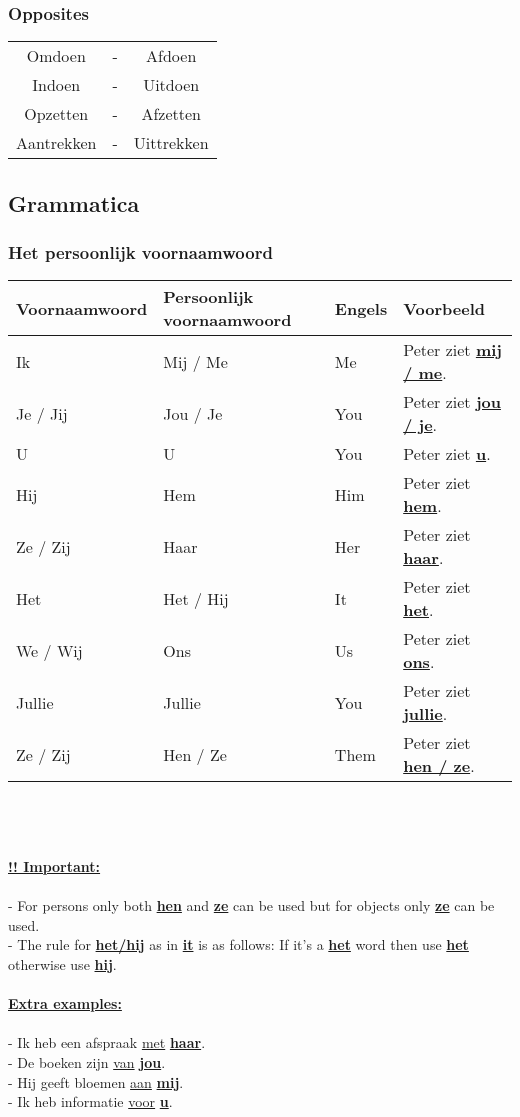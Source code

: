\documentclass[a4paper,14pt]{extarticle}
\newcommand{\attention}[1]{\underline{\textbf{!! #1}}}
\newcommand{\emp}[1]{\underline{\textbf{#1}}}
\begin{document}
\subsubsection{Opposites}
\begin{center}
\begin{tabularx}{180pt}{ c c c }
 \hline
 Omdoen & - & Afdoen \\
 Indoen & - & Uitdoen \\
 Opzetten & - & Afzetten \\
 Aantrekken & - & Uittrekken \\
\end{tabularx}
\end{center}
\newpage
\subsection{Grammatica}
\subsubsection{Het persoonlijk voornaamwoord}
\begin{tabularx}{\textwidth}{ p{} p{} p{} p{} }
 \hline
 Voornaamwoord & Persoonlijk voornaamwoord & Engels &  Voorbeeld \\
 \hline
 Ik & Mij / Me & Me & Peter ziet \emp{mij / me}. \\
 Je / Jij & Jou / Je & You & Peter ziet \emp{jou / je}. \\
 U & U & You & Peter ziet \emp{u}. \\
 Hij & Hem & Him & Peter ziet \emp{hem}. \\
 Ze / Zij & Haar & Her & Peter ziet \emp{haar}. \\
 Het & Het / Hij & It & Peter ziet \emp{het}. \\
 We / Wij & Ons & Us & Peter ziet \emp{ons}. \\
 Jullie & Jullie & You & Peter ziet \emp{jullie}. \\
 Ze / Zij & Hen / Ze & Them & Peter ziet \emp{hen / ze}. \\ 
\end{tabularx} \\ \\ \\
\attention{Important:} \\ \\
- For persons only both \emp{hen} and \emp{ze} can be used but for objects only \emp{ze} can be used. \\
- The rule for \emp{het/hij} as in \emp{it} is as follows: If it's a \emp{het} word then use \emp{het} otherwise use \emp{hij}. \\ \\
\emp{Extra examples:} \\ \\
- Ik heb een afspraak \underline{met} \emp{haar}. \\
- De boeken zijn \underline{van} \emp{jou}. \\
- Hij geeft bloemen \underline{aan} \emp{mij}. \\
- Ik heb informatie \underline{voor} \emp{u}. \\
\end{document}
